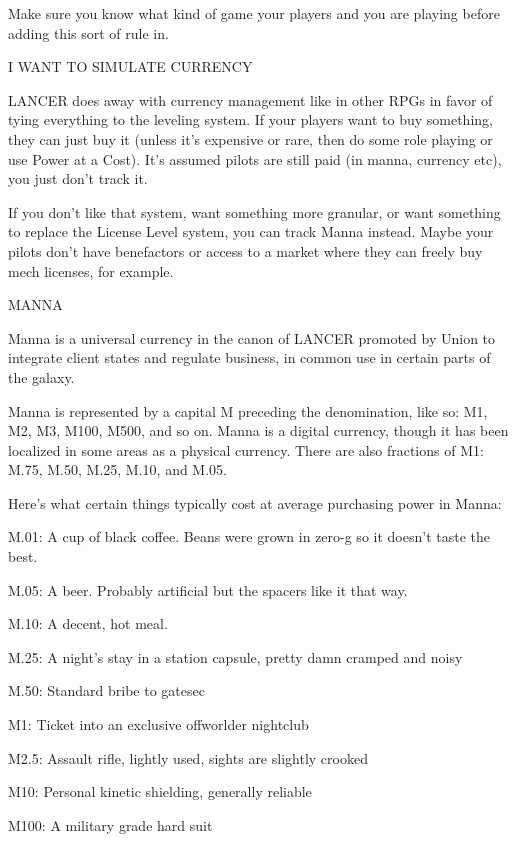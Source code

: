 Make sure you know what kind of game your players and you are playing before adding this sort
of rule in.


                                    I WANT TO SIMULATE CURRENCY

LANCER does away with currency management like in other RPGs in favor of tying everything to
the leveling system. If your players want to buy something, they can just buy it (unless it’s
expensive or rare, then do some role playing or use Power at a Cost). It’s assumed pilots are
still paid (in manna, currency etc), you just don’t track it.

If you don’t like that system, want something more granular, or want something to replace the
License Level system, you can track Manna instead. Maybe your pilots don’t have benefactors or
access to a market where they can freely buy mech licenses, for example.


                                                     MANNA

Manna is a universal currency in the canon of LANCER promoted by Union to integrate client
states and regulate business, in common use in certain parts of the galaxy.


Manna is represented by a capital M preceding the denomination, like so: M1, M2, M3, M100,
M500, and so on. Manna is a digital currency, though it has been localized in some areas as a
physical currency. There are also fractions of M1: M.75, M.50, M.25, M.10, and M.05.


Here’s what certain things typically cost at average purchasing power in Manna:





M.01: A cup of black coffee. Beans were grown in zero-g so it doesn’t taste the best.

M.05: A beer. Probably artificial but the spacers like it that way.

M.10: A decent, hot meal.

M.25: A night’s stay in a station capsule, pretty damn cramped and noisy

M.50: Standard bribe to gatesec

M1: Ticket into an exclusive offworlder nightclub

M2.5: Assault rifle, lightly used, sights are slightly crooked

M10: Personal kinetic shielding, generally reliable

M100: A military grade hard suit

